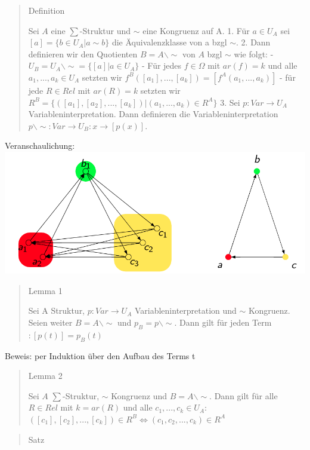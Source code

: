 \documentclass[a4paper]{article}
\begin{document}
\begin{multicols}{3}
  \begin{quote}
    Definition

    Sei $A$ eine $\sum$-Struktur und $\sim$ eine Kongruenz auf A. 1. Für
    $a\in U_A$ sei $[a]=\{b\in U_A|a\sim b\}$ die Äquivalenzklasse von a
    bzgl $\sim$. 2. Dann definieren wir den Quotienten $B=A\backslash \sim$
    von $A$ bzgl $\sim$ wie folgt: -
    $U_B=U_A\backslash\sim = \{[a]|a\in U_A\}$ - Für jedes $f\in\Omega$ mit
    $ar(f)=k$ und alle $a_1,...,a_k\in U_A$ setzten wir
    $f^B([a_1],...,[a_k])=[f^A(a_1,...,a_k)]$ - für jede $R\in Rel$ mit
    $ar(R)=k$ setzten wir
    $R^B=\{([a_1],[a_2],...,[a_k])|(a_1,...,a_k)\in R^A\}$ 3. Sei
    $p:Var\rightarrow U_A$ Variableninterpretation. Dann definieren die
    Variableninterpretation
    $p\backslash\sim: Var\rightarrow U_B:x\rightarrow[p(x)]$.
  \end{quote}

  Veranschaulichung:
  \includegraphics[width=\linewidth]{Assets/Logik-variableninterpretation-beispiel.png}

  \begin{quote}
    Lemma 1

    Sei A Struktur, $p:Var\rightarrow U_A$ Variableninterpretation und
    $\sim$ Kongruenz. Seien weiter $B=A\backslash\sim$ und
    $p_B=p\backslash\sim$. Dann gilt für jeden Term $:[p(t)]=p_B(t)$
  \end{quote}

  Beweis: per Induktion über den Aufbau des Terms t

  \begin{quote}
    Lemma 2

    Sei $A$ $\sum$-Struktur, $\sim$ Kongruenz und $B=A\backslash\sim$. Dann
    gilt für alle $R\in Rel$ mit $k=ar(R)$ und alle $c_1,...,c_k\in U_A$:
    $([c_1],[c_2],...,[c_k])\in R^B\Leftrightarrow (c_1,c_2,...,c_k)\in R^A$
  \end{quote}

  \begin{quote}
    Satz


\end{quote}
\end{multicols}
\end{document}
